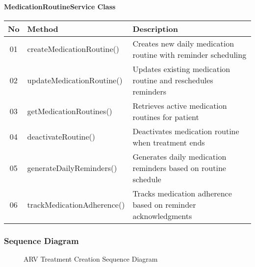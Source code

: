 \documentclass[12pt,a4paper]{article}
\begin{document}
\paragraph{MedicationRoutineService Class}
\begin{longtable}{|c|l|p{8cm}|}
\hline
\textbf{No} & \textbf{Method} & \textbf{Description} \\
\hline
01 & createMedicationRoutine() & Creates new daily medication routine with reminder scheduling \\
\hline
02 & updateMedicationRoutine() & Updates existing medication routine and reschedules reminders \\
\hline
03 & getMedicationRoutines() & Retrieves active medication routines for patient \\
\hline
04 & deactivateRoutine() & Deactivates medication routine when treatment ends \\
\hline
05 & generateDailyReminders() & Generates daily medication reminders based on routine schedule \\
\hline
06 & trackMedicationAdherence() & Tracks medication adherence based on reminder acknowledgments \\
\hline
\end{longtable}

\subsubsection{Sequence Diagram}

\begin{figure}[H]
\centering
{}
\caption{ARV Treatment Creation Sequence Diagram}
\label{fig:arv-sequence}
\end{figure}
\end{document}
